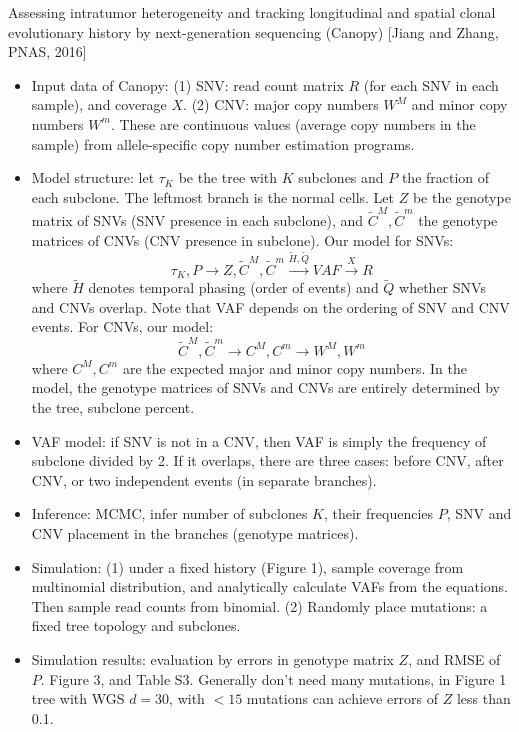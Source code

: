 \documentclass{report}
\begin{document}
Assessing intratumor heterogeneity and tracking longitudinal and spatial clonal evolutionary history by next-generation sequencing (Canopy) [Jiang and Zhang, PNAS, 2016]
\begin{itemize}
	\item Input data of Canopy: (1) SNV: read count matrix $R$ (for each SNV in each sample), and coverage $X$. (2) CNV: major copy numbers $W^M$ and minor copy numbers $W^m$. These are continuous values (average copy numbers in the sample) from allele-specific copy number estimation programs.    
	
	\item Model structure: let $\tau_K$ be the tree with $K$ subclones and $P$ the fraction of each subclone. The leftmost branch is the normal cells. Let $Z$ be the genotype matrix of SNVs (SNV presence in each subclone), and $\tilde{C}^M, \tilde{C}^m$ the genotype matrices of CNVs (CNV presence in subclone). Our model for SNVs: 
	\begin{equation}
	\tau_K, P \rightarrow Z, \tilde{C}^M, \tilde{C}^m \xrightarrow{\tilde{H}, \tilde{Q}} VAF \xrightarrow{X} R
	\end{equation}
	where $\tilde{H}$ denotes temporal phasing (order of events) and $\tilde{Q}$ whether SNVs and CNVs overlap. Note that VAF depends on the ordering of SNV and CNV events. For CNVs, our model: 
	\begin{equation}
	\tilde{C}^M, \tilde{C}^m \rightarrow C^M, C^m \rightarrow W^M, W^m
	\end{equation}
	where $C^M, C^m$ are the expected major and minor copy numbers. In the model, the genotype matrices of SNVs and CNVs are entirely determined by the tree, subclone percent. 
	
	\item VAF model: if SNV is not in a CNV, then VAF is simply the frequency of subclone divided by 2. If it overlaps, there are three cases: before CNV, after CNV, or two independent events (in separate branches). 
	
	\item Inference: MCMC, infer number of subclones $K$, their frequencies $P$, SNV and CNV placement in the branches (genotype matrices). 
	
	\item Simulation: (1) under a fixed history (Figure 1), sample coverage from multinomial distribution, and analytically calculate VAFs from the equations. Then sample read counts from binomial. (2) Randomly place mutations: a fixed tree topology and subclones. 
	
	\item Simulation results: evaluation by errors in genotype matrix $Z$, and RMSE of $P$. Figure 3, and Table S3. Generally don't need many mutations, in Figure 1 tree with WGS $d = 30$, with $<15$ mutations can achieve errors of $Z$ less than 0.1. 
\end{itemize}
\end{document}

